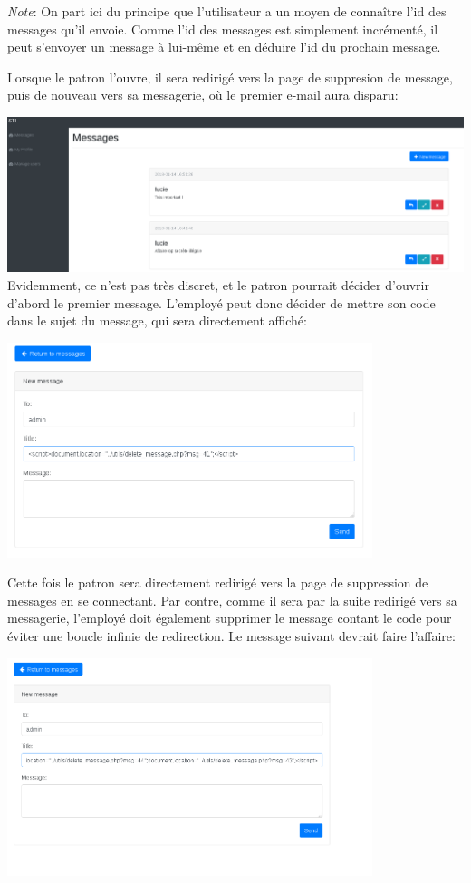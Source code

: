 \documentclass{article}
\begin{document}
\emph{Note}: On part ici du principe que l'utilisateur a un moyen de
connaître l'id des messages qu'il envoie. Comme l'id des messages est
simplement incrémenté, il peut s'envoyer un message à lui-même et en
déduire l'id du prochain message.

Lorsque le patron l'ouvre, il sera redirigé vers la page de suppresion
de message, puis de nouveau vers sa messagerie, où le premier e-mail
aura disparu:

\includegraphics[width=\textwidth]{images/delete3.PNG}\\

Evidemment, ce n'est pas très discret, et le patron pourrait décider
d'ouvrir d'abord le premier message. L'employé peut donc décider de
mettre son code dans le sujet du message, qui sera directement affiché:\\

\begin{center}\includegraphics[width=0.8\textwidth]{images/delete5.PNG}\end{center}

Cette fois le patron sera directement redirigé vers la page de
suppression de messages en se connectant. Par contre, comme il sera par
la suite redirigé vers sa messagerie, l'employé doit également supprimer
le message contant le code pour éviter une boucle infinie de
redirection. Le message suivant devrait faire l'affaire:

\begin{center}\includegraphics[width=0.8\textwidth]{images/delete7.PNG}\end{center}
\end{document}
